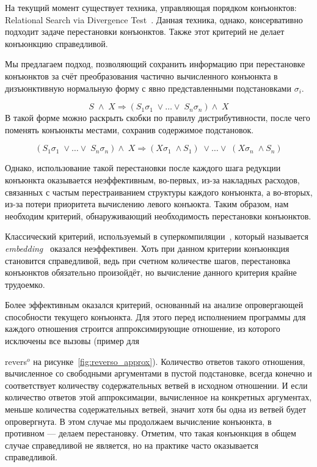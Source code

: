 \documentclass[submission,copyright,creativecommons]{eptcs}
\newcommand*{\SavedLstInline}{}
\DeclareRobustCommand*{\lstinline}{%
  \ifmmode
    \let\SavedBGroup\bgroup
    \def\bgroup{%
      \let\bgroup\SavedBGroup
      \hbox\bgroup
    }%
  \fi
  \SavedLstInline
}
\begin{document}
На текущий момент существует техника, управляющая порядком конъюнктов: Relational Search via Divergence Test~\cite{DivTest}. Данная техника, однако,
консервативно подходит задаче перестановки конъюнктов. Также этот критерий не делает конъюнкцию справедливой.

Мы предлагаем подход, позволяющий сохранить информацию при перестановке конъюнктов за счёт преобразования частично вычисленного конъюнкта в дизъюнктивную
нормальную форму с явно представленными подстановками $\sigma_i$.

$$S \; \wedge \; X \Rightarrow (S_1 \sigma_1 \; \vee \ldots \vee \; S_n \sigma_n) \wedge \; X$$
В такой форме можно раскрыть скобки по правилу дистрибутивности, после чего поменять конъюнкты местами, сохранив содержимое подстановок.

$$(S_1 \sigma_1 \; \vee \ldots \vee \; S_n \sigma_n) \wedge \; X \Rightarrow (X \sigma_1 \; \wedge S_1) \; \vee \ldots \vee \; (X \sigma_n \; \wedge S_n)$$

Однако, использование такой перестановки после каждого шага редукции конъюнкта оказывается неэффективным, во-первых, из-за накладных расходов, связанных с
частым перестраиванием структуры каждого конъюнкта, а во-вторых, из-за потери приоритета вычислению левого конъюкта.  Таким образом, нам необходим критерий,
обнаруживающий необходимость перестановки конъюнктов.

Классический критерий, используемый в суперкомпиляции~\cite{turchin1986concept}, который называется \emph{embedding}~\cite{Nash-Williams1987} оказался неэффективен.
Хоть при данном критерии конъюнкция становится справедливой, ведь при счетном количестве шагов, перестановка конъюнктов обязательно произойдёт, но вычисление
данного критерия крайне трудоемко.

Более эффективным оказался критерий, основанный на анализе опровергающей способности текущего конъюнкта. Для этого перед исполнением программы для каждого
отношения строится аппроксимирующие отношение, из которого исключены все вызовы (пример для \lstinline{revers$^o$} на рисунке~\ref{fig:reverso_approx}).
Количество ответов такого отношения, вычисленное со свободными аргументами в пустой подстановке, всегда конечно и соответствует количеству содержательных
ветвей в исходном отношении. И если количество ответов этой аппроксимации, вычисленное на конкретных аргументах, меньше количества содержательных ветвей,
значит хотя бы одна из ветвей будет опровергнута. В этом случае мы продолжаем вычисление конъюнкта, в противном --- делаем перестановку. Отметим, что
такая конъюнкция в общем случае справедливой не является, но на практике часто оказывается справедливой.
\end{document}
